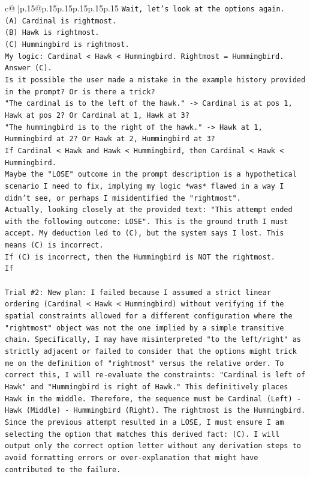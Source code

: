\documentclass{article}
\begin{document}
{\begin{supertabular}{c@{$\;$}|p{.15\linewidth}@{}p{.15\linewidth}p{.15\linewidth}p{.15\linewidth}p{.15\linewidth}p{.15\linewidth}}
{{{\texttt{Wait, let's look at the options again.} \\
\texttt{(A) Cardinal is rightmost.} \\
\texttt{(B) Hawk is rightmost.} \\
\texttt{(C) Hummingbird is rightmost.} \\
\texttt{My logic: Cardinal < Hawk < Hummingbird. Rightmost = Hummingbird. Answer (C).} \\
\texttt{Is it possible the user made a mistake in the example history provided in the prompt? Or is there a trick?} \\
\texttt{"The cardinal is to the left of the hawk." {-}> Cardinal is at pos 1, Hawk at pos 2? Or Cardinal at 1, Hawk at 3?} \\
\texttt{"The hummingbird is to the right of the hawk." {-}> Hawk at 1, Hummingbird at 2? Or Hawk at 2, Hummingbird at 3?} \\
\texttt{If Cardinal < Hawk and Hawk < Hummingbird, then Cardinal < Hawk < Hummingbird.} \\
\texttt{Maybe the "LOSE" outcome in the prompt description is a hypothetical scenario I need to fix, implying my logic *was* flawed in a way I didn't see, or perhaps I misidentified the "rightmost".} \\
\texttt{Actually, looking closely at the provided text: "This attempt ended with the following outcome: LOSE". This is the ground truth I must accept. My deduction led to (C), but the system says I lost. This means (C) is incorrect.} \\
\texttt{If (C) is incorrect, then the Hummingbird is NOT the rightmost.} \\
\texttt{If} \\
\\ 
\texttt{Trial \#2: New plan: I failed because I assumed a strict linear ordering (Cardinal < Hawk < Hummingbird) without verifying if the spatial constraints allowed for a different configuration where the "rightmost" object was not the one implied by a simple transitive chain. Specifically, I may have misinterpreted "to the left/right" as strictly adjacent or failed to consider that the options might trick me on the definition of "rightmost" versus the relative order. To correct this, I will re{-}evaluate the constraints: "Cardinal is left of Hawk" and "Hummingbird is right of Hawk." This definitively places Hawk in the middle. Therefore, the sequence must be Cardinal (Left) {-} Hawk (Middle) {-} Hummingbird (Right). The rightmost is the Hummingbird. Since the previous attempt resulted in a LOSE, I must ensure I am selecting the option that matches this derived fact: (C). I will output only the correct option letter without any derivation steps to avoid formatting errors or over{-}explanation that might have contributed to the failure.} \\
}}}
\end{supertabular}}
\end{document}
